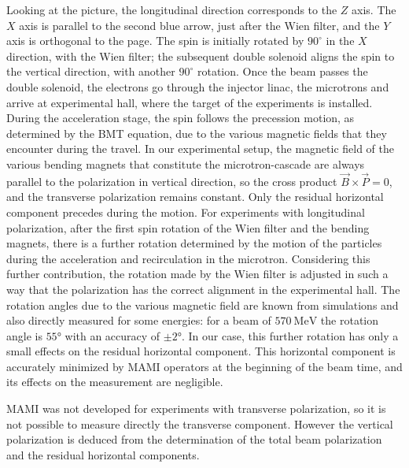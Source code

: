 Looking at the picture, the longitudinal direction corresponds to the $Z$ axis. The $X$ axis is parallel to the second blue arrow, just after the Wien filter, and the $Y$ axis is orthogonal to the page. 
The spin is initially rotated by $90^{\circ}$ in the $X$ direction, with the Wien filter; the subsequent double solenoid aligns the spin to the vertical direction, with another $90^{\circ}$ rotation. 
Once the beam passes the double solenoid, the electrons go through the injector linac, the microtrons and arrive at experimental hall, where the target of the experiments is installed. During the acceleration stage, the spin follows the precession motion, as determined by the BMT equation, due to the various magnetic fields that they encounter during the travel. In our experimental setup, the magnetic field of the various bending magnets that constitute the microtron-cascade are always parallel to the polarization in vertical direction, so the cross product $\vec{B} \times \vec{P} = 0$, and the transverse polarization remains constant. Only the residual horizontal component precedes during the motion. For experiments with longitudinal polarization, after the first spin rotation of the Wien filter and the bending magnets, there is a further rotation determined by the motion of the particles during the acceleration and recirculation in the microtron. Considering this further contribution, the rotation made by the Wien filter is adjusted in such a way that the polarization has the correct alignment in the experimental hall. The rotation angles due to the various magnetic field are known from simulations and also directly measured for some energies: for a beam of $\SI{570}{\mega \electronvolt}$ the rotation angle is $\ang{55}$ with an accuracy of $\pm \ang{2}$. In our case, this further rotation has only a small effects on the residual horizontal component. This horizontal component is accurately minimized by MAMI operators at the beginning of the beam time, and its effects on the measurement are negligible. 

MAMI was not developed for experiments with transverse polarization, so it is not possible to measure directly the transverse component. However the vertical polarization is deduced from the determination of the total beam polarization and the residual horizontal components. 

